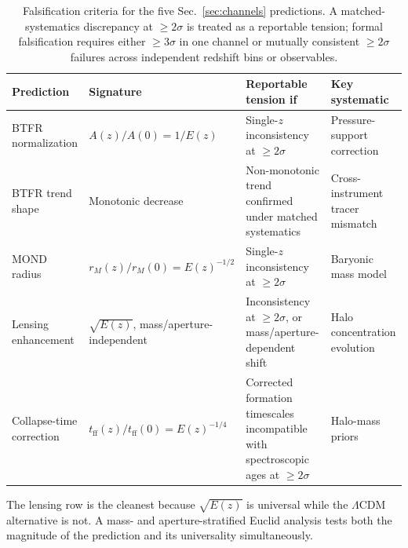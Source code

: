 \documentclass[
    aps,
    prd,
    reprint,
    superscriptaddress,
    nofootinbib,
    floatfix
]{revtex4-2}
\begin{document}
\begin{table}[tb]
\caption{\label{tab:falsification}Falsification criteria for the five
Sec.~\ref{sec:channels} predictions. A matched-systematics
discrepancy at $\geq 2\sigma$ is treated as a reportable tension;
formal falsification requires either $\geq 3\sigma$ in one channel
or mutually consistent $\geq 2\sigma$ failures across independent
redshift bins or observables.}
\begin{ruledtabular}
\begin{tabular}{p{}p{}p{}p{}}
Prediction & Signature & Reportable tension if & Key systematic \\
\hline
BTFR normalization
  & $A(z)/A(0) = 1/E(z)$
  & Single-$z$ inconsistency at $\geq 2\sigma$
  & Pressure-support correction \\
BTFR trend shape
  & Monotonic decrease
  & Non-monotonic trend confirmed under matched systematics
  & Cross-instrument tracer mismatch \\
MOND radius
  & $r_M(z)/r_M(0) = E(z)^{-1/2}$
  & Single-$z$ inconsistency at $\geq 2\sigma$
  & Baryonic mass model \\
Lensing enhancement
  & $\sqrt{E(z)}$, mass/aperture-independent
  & Inconsistency at $\geq 2\sigma$, or mass/aperture-dependent shift
  & Halo concentration evolution \\
Collapse-time correction
  & $t_\text{ff}(z)/t_\text{ff}(0) = E(z)^{-1/4}$
  & Corrected formation timescales incompatible with spectroscopic
    ages at $\geq 2\sigma$
  & Halo-mass priors \\
\end{tabular}
\end{ruledtabular}
\end{table}

The lensing row is the cleanest because $\sqrt{E(z)}$ is universal
while the $\Lambda$CDM alternative is not. A mass- and
aperture-stratified Euclid analysis tests both the magnitude of the
prediction and its universality simultaneously.
\end{document}
